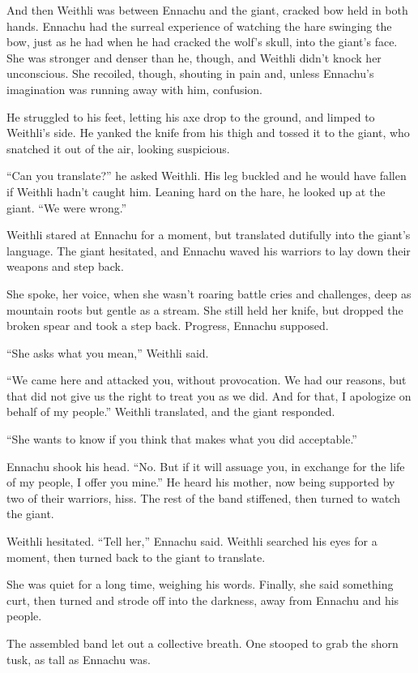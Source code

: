 And then Weithli was between Ennachu and the giant, cracked bow held in both hands. Ennachu had the surreal experience of watching the hare swinging the bow, just as he had when he had cracked the wolf's skull, into the giant's face. She was stronger and denser than he, though, and Weithli didn't knock her unconscious. She recoiled, though, shouting in pain and, unless Ennachu's imagination was running away with him, confusion.

He struggled to his feet, letting his axe drop to the ground, and limped to Weithli's side. He yanked the knife from his thigh and tossed it to the giant, who snatched it out of the air, looking suspicious.

``Can you translate?'' he asked Weithli. His leg buckled and he would have fallen if Weithli hadn't caught him. Leaning hard on the hare, he looked up at the giant. ``We were wrong.''

Weithli stared at Ennachu for a moment, but translated dutifully into the giant's language. The giant hesitated, and Ennachu waved his warriors to lay down their weapons and step back.

She spoke, her voice, when she wasn't roaring battle cries and challenges, deep as mountain roots but gentle as a stream. She still held her knife, but dropped the broken spear and took a step back. Progress, Ennachu supposed.

``She asks what you mean,'' Weithli said.

``We came here and attacked you, without provocation. We had our reasons, but that did not give us the right to treat you as we did. And for that, I apologize on behalf of my people.'' Weithli translated, and the giant responded.

``She wants to know if you think that makes what you did acceptable.''

Ennachu shook his head. ``No. But if it will assuage you, in exchange for the life of my people, I offer you mine.'' He heard his mother, now being supported by two of their warriors, hiss. The rest of the band stiffened, then turned to watch the giant.

Weithli hesitated. ``Tell her,'' Ennachu said. Weithli searched his eyes for a moment, then turned back to the giant to translate.

She was quiet for a long time, weighing his words. Finally, she said something curt, then turned and strode off into the darkness, away from Ennachu and his people.

The assembled band let out a collective breath. One stooped to grab the shorn tusk, as tall as Ennachu was.

